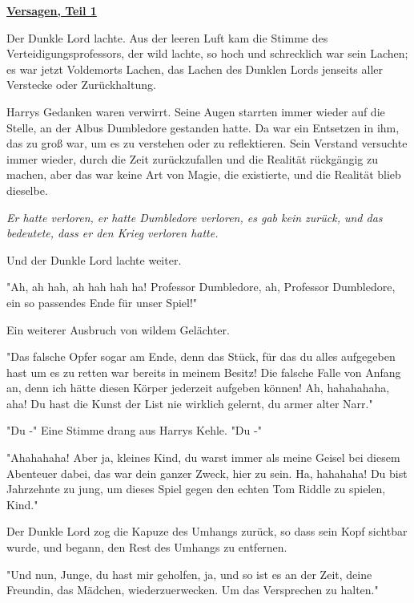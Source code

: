 

\hypertarget{versagen-teil-1}{%

\textbf{\uline{Versagen, Teil 1}}

Der Dunkle Lord lachte. Aus der leeren Luft kam die Stimme des Verteidigungsprofessors, der wild lachte, so hoch und schrecklich war sein Lachen; es war jetzt Voldemorts Lachen, das Lachen des Dunklen Lords jenseits aller Verstecke oder Zurückhaltung.

Harrys Gedanken waren verwirrt. Seine Augen starrten immer wieder auf die Stelle, an der Albus Dumbledore gestanden hatte. Da war ein Entsetzen in ihm, das zu groß war, um es zu verstehen oder zu reflektieren. Sein Verstand versuchte immer wieder, durch die Zeit zurückzufallen und die Realität rückgängig zu machen, aber das war keine Art von Magie, die existierte, und die Realität blieb dieselbe.

\emph{Er hatte verloren, er hatte Dumbledore verloren, es gab kein zurück, und das bedeutete, dass er den Krieg verloren hatte.}

Und der Dunkle Lord lachte weiter.

"Ah, ah hah, ah hah hah ha! Professor Dumbledore, ah, Professor Dumbledore, ein so passendes Ende für unser Spiel!"

Ein weiterer Ausbruch von wildem Gelächter.

"Das falsche Opfer sogar am Ende, denn das Stück, für das du alles aufgegeben hast um es zu retten war bereits in meinem Besitz! Die falsche Falle von Anfang an, denn ich hätte diesen Körper jederzeit aufgeben können! Ah, hahahahaha, aha! Du hast die Kunst der List nie wirklich gelernt, du armer alter Narr."

"Du -" Eine Stimme drang aus Harrys Kehle. "Du -"

"Ahahahaha! Aber ja, kleines Kind, du warst immer als meine Geisel bei diesem Abenteuer dabei, das war dein ganzer Zweck, hier zu sein. Ha, hahahaha! Du bist Jahrzehnte zu jung, um dieses Spiel gegen den echten Tom Riddle zu spielen, Kind."

Der Dunkle Lord zog die Kapuze des Umhangs zurück, so dass sein Kopf sichtbar wurde, und begann, den Rest des Umhangs zu entfernen.

"Und nun, Junge, du hast mir geholfen, ja, und so ist es an der Zeit, deine Freundin, das Mädchen, wiederzuerwecken. Um das Versprechen zu halten."

}
